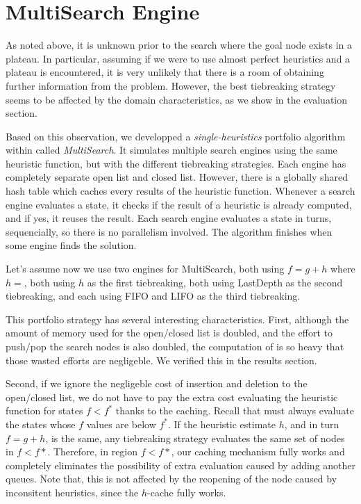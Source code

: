  
\section{MultiSearch Engine}

As noted above, it is unknown prior to the search where the goal node
exists in a plateau. In particular, assuming if we were to use almost
perfect heuristics and a plateau is encountered, it is very unlikely
that there is a room of obtaining further information from the problem.
However, the best tiebreaking strategy seems to be affected by the domain
characteristics, as we show in the evaluation section.

Based on this observation, we developped a \emph{single-heuristics} portfolio
algorithm within \astar called \emph{MultiSearch}.  It simulates
multiple search engines using the same heuristic function, but with the
different tiebreaking strategies.  Each engine has completely separate
open list and closed list.  However, there is a globally shared hash
table which caches every results of the heuristic function.  Whenever a
search engine evaluates a state, it checks if the result of a heuristic is
already computed, and if yes, it reuses the result.  Each search engine
evaluates a state in turns, sequencially, so there is no parallelism
involved. The algorithm finishes when some engine finds the solution.

Let's assume now we use two \astar engines for MultiSearch, both using
$f=g+h$ where $h=$\lmcut, both using $h$ as the first tiebreaking, both
using LastDepth as the second tiebreaking, and each using FIFO and LIFO
as the third tiebreaking.

This portfolio strategy has several interesting characteristics.  First,
although the amount of memory used for the open/closed list is doubled,
and the effort to push/pop the search nodes is also doubled, the
computation of \lmcut is so heavy that those wasted efforts are
negligeble.  We verified this in the results section.

Second, if we ignore the negligeble cost of insertion and deletion to the open/closed list, we do not have to pay the extra cost evaluating the heuristic function for states $f<f^*$ thanks to the caching.
Recall that \astar must always evaluate the states whose $f$ values are below $f^*$. If the heuristic estimate $h$, and in turn $f=g+h$, is the same, any tiebreaking strategy evaluates the same set of nodes in $f<f*$.
Therefore, in region $f<f*$, our caching mechanism fully works and completely eliminates the possibility of extra evaluation caused by adding another queues.
Note that, this is not affected by the reopening of the node caused by
inconsitent heuristics, since the $h$-cache fully works.

